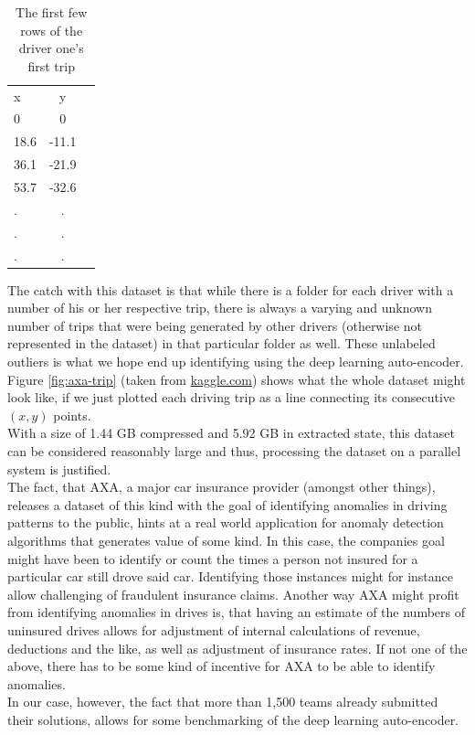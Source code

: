 \documentclass{vldb}
\begin{document}
\begin{table}
\centering
\begin{tabular}{l c r}
x & y\\
0 & 0\\
18.6 & -11.1 \\
36.1 & -21.9 \\
53.7 & -32.6 \\
. & .  \\
. & . \\
. & . \\	
\end{tabular}
\caption{The first few rows of the driver one's first trip}
\label{table:raw-trace}
\end{table}

The catch with this dataset is that while there is a folder for each driver with a number of his or her respective trip, there is always a varying and unknown number of trips that were being generated by other drivers (otherwise not represented in the dataset) in that particular folder as well. These unlabeled outliers is what we hope end up identifying using the deep learning auto-encoder. \\
Figure \ref{fig:axa-trip} (taken from \href{https://www.kaggle.com/c/axa-driver-telematics-analysis/data}{kaggle.com}) shows what the whole dataset might look like, if we just plotted each driving trip as a line connecting its consecutive $(x, y)$ points.\\

With a size of 1.44 GB compressed and 5.92 GB in extracted state, this dataset can be considered reasonably large and thus, processing the dataset on a parallel system is justified. \\
The fact, that AXA, a major car insurance provider (amongst other things), releases a dataset of this kind with the goal of identifying anomalies in driving patterns to the public, hints at a real world application for anomaly detection algorithms that generates value of some kind. In this case, the companies goal might have been to identify or count the times a person not insured for a particular car still drove said car. Identifying those instances might for instance allow challenging of fraudulent insurance claims. Another way AXA might profit from identifying anomalies in drives is, that having an estimate of the numbers of uninsured drives allows for adjustment of internal calculations of revenue, deductions and the like, as well as adjustment of insurance rates. If not one of the above, there has to be some kind of incentive for AXA to be able to identify anomalies. \\
In our case, however, the fact that more than 1,500 teams already submitted their solutions, allows for some benchmarking of the deep learning auto-encoder.
\end{document}
